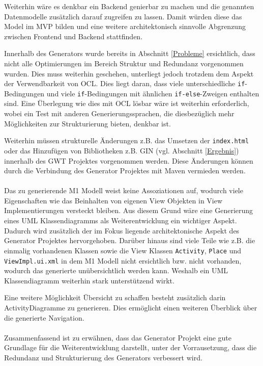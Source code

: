 Weiterhin wäre es denkbar ein Backend genierbar zu machen und die
genannten Datenmodelle zusätzlich darauf zugreifen zu lassen. Damit würden
diese das Model im MVP bilden und eine weitere architektonisch sinnvolle Abgrenzung zwischen Frontend
und Backend stattfinden.

Innerhalb des Generators wurde bereits in Abschnitt \ref{Probleme} ersichtlich,
dass nicht alle Optimierungen im Bereich Struktur und Redundanz vorgenommen wurden.
Dies muss weiterhin geschehen, unterliegt jedoch trotzdem dem Aspekt der
Verwendbarkeit von OCL. Dies liegt daran, dass viele
unterschiedliche \texttt{if}-Bedingungen und viele \texttt{if}-Bedingungen mit
ähnlichen \texttt{if-else}-Zweigen enthalten sind. Eine Überlegung wie dies mit
OCL lösbar wäre ist weiterhin erforderlich, wobei ein Test mit anderen Generierungssprachen,
die diesbezüglich mehr Möglichkeiten zur Strukturierung bieten, denkbar ist.

Weiterhin müssen strukturelle Änderungen z.B. das Umsetzen der
\texttt{index.html} oder das Hinzufügen von Bibliotheken z.B. GIN (vgl.
Abschnitt \ref{Ergebnis}) innerhalb des GWT Projektes vorgenommen werden. Diese
Änderungen können durch die Verbindung des Generator Projektes mit Maven vermieden werden.
\\\\
Das zu generierende M1 Modell weist keine Assoziationen auf, wodurch viele
Eigenschaften wie das Beinhalten von eigenen View Objekten in View
Implementierungen versteckt bleiben. Aus diesem Grund wäre eine Generierung
eines UML Klassendiagramms als Weiterentwicklung ein wichtiger Aspekt. Dadurch wird zusätzlich der im Fokus
liegende architektonische Aspekt des Generator Projektes hervorgehoben.
Darüber hinaus sind viele Teile wie z.B. die einmalig vorhandenen Klassen sowie die View
Klassen \texttt{Activity}, \texttt{Place} und \texttt{ViewImpl.ui.xml} in
dem M1 Modell nicht ersichtlich bzw. nicht vorhanden, wodurch das generierte
unübersichtlich werden kann. Weshalb ein UML Klassendiagramm weiterhin stark unterstützend wirkt. 

Eine weitere Möglichkeit Übersicht zu schaffen besteht zusätzlich darin
ActivityDiagramme zu generieren. Dies ermöglicht einen weiteren Überblick über
die generierte Navigation.
\\\\
Zusammenfassend ist zu erwähnen, dass das Generator Projekt eine gute
Grundlage für die Weiterentwicklung darstellt, unter der Vorrausetzung, dass die
Redundanz und Strukturierung des Generators verbessert wird.

